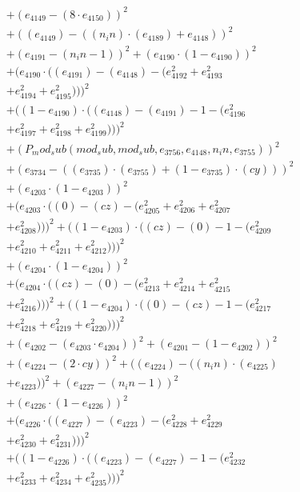 \documentclass[10pt, a4paper]{article}
\begin{document}
\begin{small}
\begin{align*}
& + (e_{4149} - (8  \cdot  e_{4150}))^{2} \\
& + ((e_{4149}) - ((n_in)  \cdot  (e_{4189}) + e_{4148}))^{2} \\
& + (e_{4191} - (n_in - 1))^{2} + (e_{4190}  \cdot  (1 - e_{4190}))^{2} \\
& + (e_{4190}  \cdot  ((e_{4191}) - (e_{4148}) - (e_{4192}^{2} + e_{4193}^{2} \\
& + e_{4194}^{2} + e_{4195}^{2})))^{2} \\
& + ((1 - e_{4190})  \cdot  ((e_{4148}) - (e_{4191}) - 1 - (e_{4196}^{2} \\
& + e_{4197}^{2} + e_{4198}^{2} + e_{4199}^{2})))^{2} \\
& + (P_mod_sub(mod_sub, mod_sub, e_{3756}, e_{4148}, n_in, e_{3755}))^{2} \\
& + (e_{3734} - ((e_{3735})  \cdot  (e_{3755}) + (1 - e_{3735})  \cdot  (cy)))^{2} \\
& + (e_{4203}  \cdot  (1 - e_{4203}))^{2} \\
& + (e_{4203}  \cdot  ((0) - (cz) - (e_{4205}^{2} + e_{4206}^{2} + e_{4207}^{2} \\
& + e_{4208}^{2})))^{2} + ((1 - e_{4203})  \cdot  ((cz) - (0) - 1 - (e_{4209}^{2} \\
& + e_{4210}^{2} + e_{4211}^{2} + e_{4212}^{2})))^{2} \\
& + (e_{4204}  \cdot  (1 - e_{4204}))^{2} \\
& + (e_{4204}  \cdot  ((cz) - (0) - (e_{4213}^{2} + e_{4214}^{2} + e_{4215}^{2} \\
& + e_{4216}^{2})))^{2} + ((1 - e_{4204})  \cdot  ((0) - (cz) - 1 - (e_{4217}^{2} \\
& + e_{4218}^{2} + e_{4219}^{2} + e_{4220}^{2})))^{2} \\
& + (e_{4202} - (e_{4203}  \cdot  e_{4204}))^{2} + (e_{4201} - (1 - e_{4202}))^{2} \\
& + (e_{4224} - (2  \cdot  cy))^{2} + ((e_{4224}) - ((n_in)  \cdot  (e_{4225}) \\
& + e_{4223}))^{2} + (e_{4227} - (n_in - 1))^{2} \\
& + (e_{4226}  \cdot  (1 - e_{4226}))^{2} \\
& + (e_{4226}  \cdot  ((e_{4227}) - (e_{4223}) - (e_{4228}^{2} + e_{4229}^{2} \\
& + e_{4230}^{2} + e_{4231}^{2})))^{2} \\
& + ((1 - e_{4226})  \cdot  ((e_{4223}) - (e_{4227}) - 1 - (e_{4232}^{2} \\
& + e_{4233}^{2} + e_{4234}^{2} + e_{4235}^{2})))^{2} \\

\end{align*}
\end{small}
\end{document}
